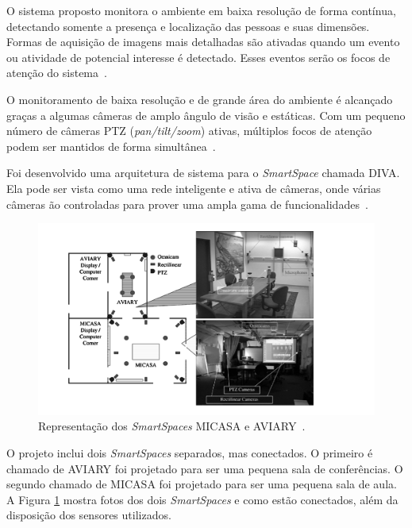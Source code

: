 O sistema proposto monitora o ambiente em baixa resolução de forma contínua, detectando somente a presença e localização das pessoas e suas dimensões. Formas de aquisição de imagens mais detalhadas são ativadas quando um evento ou atividade de potencial interesse é detectado. Esses eventos serão os focos de atenção do sistema~\cite{trivedi}.

O monitoramento de baixa resolução e de grande área do ambiente é alcançado graças a algumas câmeras de amplo ângulo de visão e estáticas. Com um pequeno número de câmeras PTZ (\textit{pan/tilt/zoom}) ativas, múltiplos focos de atenção podem ser mantidos de forma simultânea~\cite{trivedi}.

Foi desenvolvido uma arquitetura de sistema para o \textit{SmartSpace} chamada DIVA. Ela pode ser vista como uma rede inteligente e ativa de câmeras, onde várias câmeras ão controladas para prover uma ampla gama de funcionalidades~\cite{trivedi}.

	\begin{figure}[hbt]
		\begin{center}
			\includegraphics[scale=0.5]{figuras/3.TrabalhosCorrelatos/micasa_aviary.png}
		\end{center}
		\caption{Representação dos \textit{SmartSpaces} MICASA e AVIARY~\cite{trivedi}.}
		\label{micasa_aviary}
	\end{figure}

O projeto inclui dois \textit{SmartSpaces} separados, mas conectados. O primeiro é chamado de AVIARY foi projetado para ser uma pequena sala de conferências. O segundo chamado de MICASA foi projetado para ser uma pequena sala de aula. A Figura \ref{micasa_aviary} mostra fotos dos dois \textit{SmartSpaces} e como estão conectados, além da disposição dos sensores utilizados.

